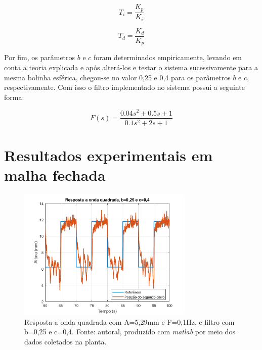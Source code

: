 \documentclass{ifacconf}
\begin{document}
\begin{equation*}
  T_{i} = \frac{K_{p}}{K_{i}}
  \label{equa: ti}
\end{equation*}

\begin{equation*}
  T_{d} = \frac{K_{d}}{K_{p}}
  \label{equa: td}
\end{equation*}

Por fim, os parâmetros $b$ e $c$ foram determinados empiricamente, levando em conta a teoria explicada e após alterá-los e testar o sistema sucessivamente para a mesma bolinha esférica, 
chegou-se no valor 0,25 e 0,4 para os parâmetros $b$ e $c$, respectivamente. Com isso o filtro implementado no sistema possui a seguinte forma:

\begin{equation}
  F(s) = \frac{0.04s^2+0.5s+1}{0.1s^2+2s+1}
  \label{equa: filtro completo}
\end{equation}


\section{Resultados experimentais em malha fechada}

\begin{figure}[!htb]
  \begin{center}
  \includegraphics[width=8.4cm]{figures/resultado_teste1.png}    %
  \caption{Resposta a onda quadrada com A=5,29mm e F=0,1Hz, e filtro com b=0,25 e c=0,4. Fonte: autoral, produzido com \textit{matlab} por meio dos dados coletados na planta.} 
  \label{fig:teste1}
  \end{center}
\end{figure}
\end{document}
